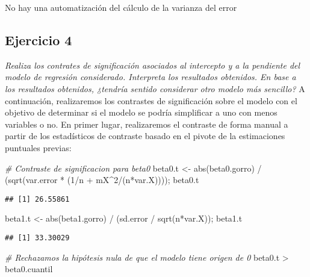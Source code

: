 \documentclass[
]{article}
\newenvironment{Shaded}{\begin{snugshade}}{\end{snugshade}}
\newcommand{\CommentTok}[1]{\textcolor[rgb]{0.56,0.35,0.01}{\textit{#1}}}
\newcommand{\DecValTok}[1]{\textcolor[rgb]{0.00,0.00,0.81}{#1}}
\newcommand{\FunctionTok}[1]{\textcolor[rgb]{0.00,0.00,0.00}{#1}}
\newcommand{\NormalTok}[1]{#1}
\newcommand{\OtherTok}[1]{\textcolor[rgb]{0.56,0.35,0.01}{#1}}
\newcommand{\SpecialCharTok}[1]{\textcolor[rgb]{0.00,0.00,0.00}{#1}}
\begin{document}
No hay una automatización del cálculo de la varianza del error

\hypertarget{ejercicio-4}{%
\subsection{Ejercicio 4}\label{ejercicio-4}}

\textit{Realiza los contrates de significación asociados al intercepto y a la pendiente del
modelo de regresión considerado. Interpreta los resultados obtenidos. En base a
los resultados obtenidos, ¿tendría sentido considerar otro modelo más sencillo?}
A continuación, realizaremos los contrastes de significación sobre el
modelo con el objetivo de determinar si el modelo se podría simplificar
a uno con menos variables o no. En primer lugar, realizaremos el
contraste de forma manual a partir de los estadísticos de contraste
basado en el pivote de la estimaciones puntuales previas:

\begin{Shaded}
\begin{Highlighting}[]
\CommentTok{\# Contraste de significacion para beta0}
\NormalTok{beta0.t }\OtherTok{\textless{}{-}} \FunctionTok{abs}\NormalTok{(beta0.gorro) }\SpecialCharTok{/}\NormalTok{ (}\FunctionTok{sqrt}\NormalTok{(var.error }\SpecialCharTok{*}\NormalTok{ (}\DecValTok{1}\SpecialCharTok{/}\NormalTok{n }\SpecialCharTok{+}\NormalTok{ mX}\SpecialCharTok{\^{}}\DecValTok{2}\SpecialCharTok{/}\NormalTok{(n}\SpecialCharTok{*}\NormalTok{var.X)))); beta0.t}
\end{Highlighting}
\end{Shaded}

\begin{verbatim}
## [1] 26.55861
\end{verbatim}

\begin{Shaded}
\begin{Highlighting}[]
\NormalTok{beta1.t }\OtherTok{\textless{}{-}} \FunctionTok{abs}\NormalTok{(beta1.gorro) }\SpecialCharTok{/}\NormalTok{ (sd.error }\SpecialCharTok{/} \FunctionTok{sqrt}\NormalTok{(n}\SpecialCharTok{*}\NormalTok{var.X)); beta1.t}
\end{Highlighting}
\end{Shaded}

\begin{verbatim}
## [1] 33.30029
\end{verbatim}

\begin{Shaded}
\begin{Highlighting}[]
\CommentTok{\# Rechazamos la hipótesis nula de que el modelo tiene origen de 0}
\NormalTok{beta0.t }\SpecialCharTok{\textgreater{}}\NormalTok{ beta0.cuantil }
\end{Highlighting}
\end{Shaded}
\end{document}
